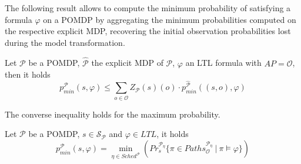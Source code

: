 
The following result allows to compute the minimum probability of satisfying a formula $\varphi$ on a \ac{POMDP} by 
aggregating the
minimum probabilities computed on the respective explicit \ac{MDP}, recovering the initial observation probabilities lost during the model transformation.

\begin{theorem}\label{teo:pmins}
Let $\mathcal{P}$ be a \ac{POMDP}, $\widehat{\mathcal{P}}$ the explicit \ac{MDP} of $\mathcal{P}$, $\varphi$ an LTL formula with $AP = \mathcal{O}$, then it holds
	$$ p_{min}^\mathcal{P}(s, \varphi) \leq \sum_{o\in\mathcal{O}} Z_\mathcal{P}(s)(o) \cdot p_{min}^{\widehat{\mathcal{P}}}((s,o), \varphi) $$
\end{theorem}

The converse inequality holds for the maximum probability.


\begin{corollary}\label{cor:infmin}
Let $\mathcal{P}$ be a \ac{POMDP}, $s \in \mathcal{S}_{\mathcal{P}}$ and $\varphi \in LTL$, it holds
$$ p_{min}^\mathcal{P}(s,\varphi) = \min_{\eta\in Sched^\mathcal{P}} \left(Pr_s^{\mathcal{P}_\eta}\{\pi \in Paths_\mathcal{O}^{\mathcal{P}_\eta}\ |\ \pi \models \varphi \}\right) $$
\end{corollary}

